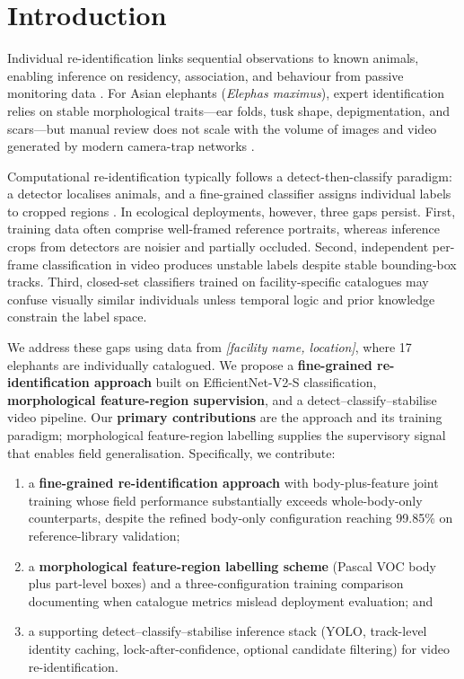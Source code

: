 \documentclass[preprint,12pt,3p,times]{elsarticle}
\begin{document}
\section{Introduction}
\label{sec:intro}

Individual re-identification links sequential observations to known animals, enabling inference on residency, association, and behaviour from passive monitoring data \citep{kuhl2014, schofield2019}. For Asian elephants (\textit{Elephas maximus}), expert identification relies on stable morphological traits---ear folds, tusk shape, depigmentation, and scars---but manual review does not scale with the volume of images and video generated by modern camera-trap networks \citep{plotnik2011, weinstein2018, norouzzadeh2021}.

Computational re-identification typically follows a detect-then-classify paradigm: a detector localises animals, and a fine-grained classifier assigns individual labels to cropped regions \citep{schneider2019, tabak2019}. In ecological deployments, however, three gaps persist. First, training data often comprise well-framed reference portraits, whereas inference crops from detectors are noisier and partially occluded. Second, independent per-frame classification in video produces unstable labels despite stable bounding-box tracks. Third, closed-set classifiers trained on facility-specific catalogues may confuse visually similar individuals unless temporal logic and prior knowledge constrain the label space.

We address these gaps using data from \textit{[facility name, location]}, where 17 elephants are individually catalogued. We propose a \textbf{fine-grained re-identification approach} built on EfficientNet-V2-S classification, \textbf{morphological feature-region supervision}, and a detect--classify--stabilise video pipeline. Our \textbf{primary contributions} are the approach and its training paradigm; morphological feature-region labelling supplies the supervisory signal that enables field generalisation. Specifically, we contribute:
\begin{enumerate}
  \item a \textbf{fine-grained re-identification approach} with body-plus-feature joint training whose field performance substantially exceeds whole-body-only counterparts, despite the refined body-only configuration reaching 99.85\% on reference-library validation;
  \item a \textbf{morphological feature-region labelling scheme} (Pascal VOC body plus part-level boxes) and a three-configuration training comparison documenting when catalogue metrics mislead deployment evaluation; and
  \item a supporting detect--classify--stabilise inference stack (YOLO, track-level identity caching, lock-after-confidence, optional candidate filtering) for video re-identification.
\end{enumerate}
\end{document}

